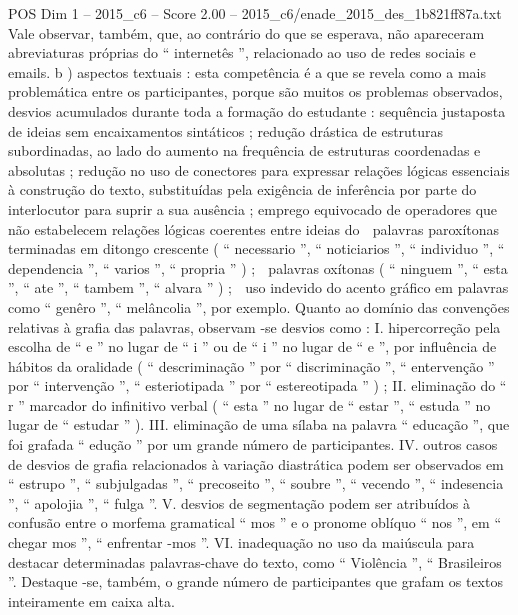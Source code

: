 \begin{textsample}{POS Dim 1 – 2015\_c6 – Score 2.00 – 2015\_c6/enade\_2015\_des\_1b821ff87a.txt}
Vale observar, também, que, ao contrário do que se esperava, não apareceram abreviaturas próprias do “ internetês ”, relacionado ao uso de redes sociais e emails. b ) aspectos textuais : esta competência é a que se revela como a mais problemática entre os participantes, porque são muitos os problemas observados, desvios acumulados durante toda a formação do estudante : sequência justaposta de ideias sem encaixamentos sintáticos ; redução drástica de estruturas subordinadas, ao lado do aumento na frequência de estruturas coordenadas e absolutas ; redução no uso de conectores para expressar relações lógicas essenciais à construção do texto, substituídas pela exigência de inferência por parte do interlocutor para suprir a sua ausência ; emprego equivocado de operadores que não estabelecem relações lógicas coerentes entre ideias do  palavras paroxítonas terminadas em ditongo crescente ( “ necessario ”, “ noticiarios ”, “ individuo ”, “ dependencia ”, “ varios ”, “ propria ” ) ;  palavras oxítonas ( “ ninguem ”, “ esta ”, “ ate ”, “ tambem ”, “ alvara ” ) ;  uso indevido do acento gráfico em palavras como “ genêro ”, “ melâncolia ”, por exemplo.
Quanto ao domínio das convenções relativas à grafia das palavras, observam -se desvios como : I. hipercorreção pela escolha de “ e ” no lugar de “ i ” ou de “ i ” no lugar de “ e ”, por influência de hábitos da oralidade ( “ descriminação ” por “ discriminação ”, “ entervenção ” por “ intervenção ”, “ esteriotipada ” por “ estereotipada ” ) ; II. eliminação do “ r ” marcador do infinitivo verbal ( “ esta ” no lugar de “ estar ”, “ estuda ” no lugar de “ estudar ” ).
III. eliminação de uma sílaba na palavra “ educação ”, que foi grafada “ edução ” por um grande número de participantes.
IV. outros casos de desvios de grafia relacionados à variação diastrática podem ser observados em “ estrupo ”, “ subjulgadas ”, “ precoseito ”, “ soubre ”, “ vecendo ”, “ indesencia ”, “ apolojia ”, “ fulga ”.
V. desvios de segmentação podem ser atribuídos à confusão entre o morfema gramatical “ mos ” e o pronome oblíquo “ nos ”, em “ chegar mos ”, “ enfrentar -mos ”.
VI. inadequação no uso da maiúscula para destacar determinadas palavras-chave do texto, como “ Violência ”, “ Brasileiros ”.
Destaque -se, também, o grande número de participantes que grafam os textos inteiramente em caixa alta.

\end{textsample}
